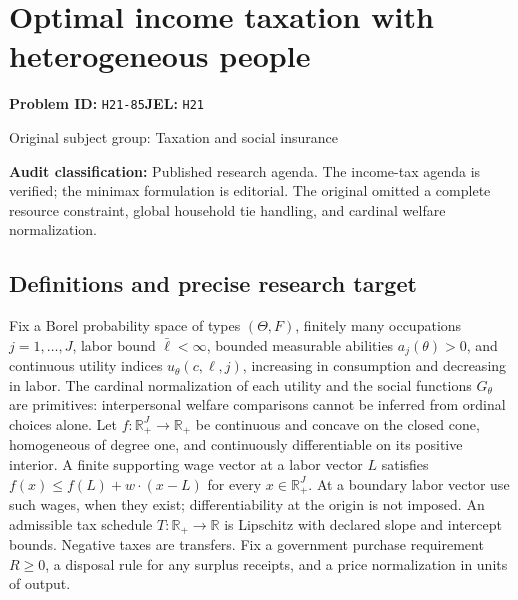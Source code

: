 \documentclass[11pt,a4paper]{article}
\begin{document}
\section*{Optimal income taxation with heterogeneous people}
\textbf{Problem ID:} \texttt{H21-85}\quad \textbf{JEL:} \texttt{H21}\par
\label{problem:OP-0470}
{\sffamily\small\color{muted}Original subject group: Taxation and social insurance\par}
\label{definitions:problem:30007752}
\textbf{Audit classification:} Published research agenda. The income-tax agenda is verified; the minimax formulation is editorial. The original omitted a complete resource constraint, global household tie handling, and cardinal welfare normalization.
\subsection*{Definitions and precise research target}
Fix a Borel probability space of types \((\Theta,F)\), finitely many occupations \(j=1,\ldots,J\), labor bound \(\bar\ell<\infty\), bounded measurable abilities \(a_j(\theta)>0\), and continuous utility indices \(u_\theta(c,\ell,j)\), increasing in consumption and decreasing in labor. The cardinal normalization of each utility and the social functions \(G_\theta\) are primitives: interpersonal welfare comparisons cannot be inferred from ordinal choices alone. Let \(f:\mathbb R_+^J\to\mathbb R_+\) be continuous and concave on the closed cone, homogeneous of degree one, and continuously differentiable on its positive interior. A finite supporting wage vector at a labor vector \(L\) satisfies \(f(x)\leq f(L)+w\cdot(x-L)\) for every \(x\in\mathbb R_+^J\). At a boundary labor vector use such wages, when they exist; differentiability at the origin is not imposed. An admissible tax schedule \(T:\mathbb R_+\to\mathbb R\) is Lipschitz with declared slope and intercept bounds. Negative taxes are transfers. Fix a government purchase requirement \(R\geq0\), a disposal rule for any surplus receipts, and a price normalization in units of output.
\end{document}
